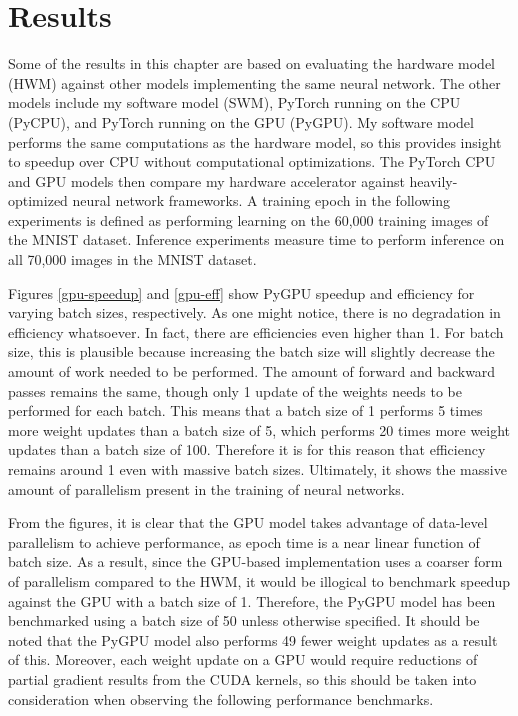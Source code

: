 \chapter{Results}
Some of the results in this chapter are based on evaluating the hardware model (HWM) against other models implementing the same neural network. The other models include my software model (SWM), PyTorch running on the CPU (PyCPU), and PyTorch running on the GPU (PyGPU). My software model performs the same computations as the hardware model, so this provides insight to speedup over CPU without computational optimizations. The PyTorch CPU and GPU models then compare my hardware accelerator against heavily-optimized neural network frameworks. A training epoch in the following experiments is defined as performing learning on the 60,000 training images of the MNIST dataset. Inference experiments measure time to perform inference on all 70,000 images in the MNIST dataset.

Figures \ref{gpu-speedup} and \ref{gpu-eff} show PyGPU speedup and efficiency for varying batch sizes, respectively. As one might notice, there is no degradation in efficiency whatsoever. In fact, there are efficiencies even higher than 1. For batch size, this is plausible because increasing the batch size will slightly decrease the amount of work needed to be performed. The amount of forward and backward passes remains the same, though only 1 update of the weights needs to be performed for each batch. This means that a batch size of 1 performs 5 times more weight updates than a batch size of 5, which performs 20 times more weight updates than a batch size of 100. Therefore it is for this reason that efficiency remains around 1 even with massive batch sizes. Ultimately, it shows the massive amount of parallelism present in the training of neural networks. 

From the figures, it is clear that the GPU model takes advantage of data-level parallelism to achieve performance, as epoch time is a near linear function of batch size. As a result, since the GPU-based implementation uses a coarser form of parallelism compared to the HWM, it would be illogical to benchmark speedup against the GPU with a batch size of 1. Therefore, the PyGPU model has been benchmarked using a batch size of 50 unless otherwise specified. It should be noted that the PyGPU model also performs 49 fewer weight updates as a result of this. Moreover, each weight update on a GPU would require reductions of partial gradient results from the CUDA kernels, so this should be taken into consideration when observing the following performance benchmarks.

